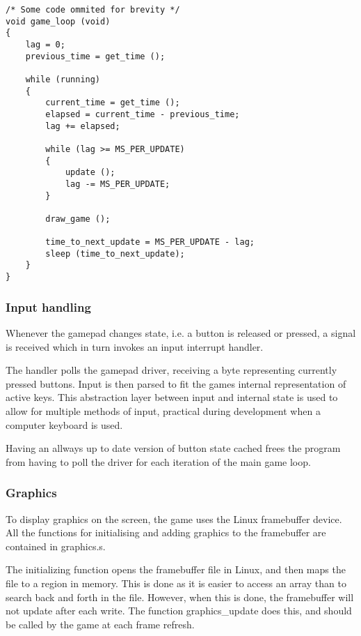 \begin{lstlisting}[caption={Main game loop}, label={lst:main-game-loop}]
/* Some code ommited for brevity */
void game_loop (void)
{
    lag = 0;
    previous_time = get_time ();

    while (running)
    {
        current_time = get_time ();
        elapsed = current_time - previous_time;
        lag += elapsed;

        while (lag >= MS_PER_UPDATE)
        {
            update ();
            lag -= MS_PER_UPDATE;
        }

        draw_game ();

        time_to_next_update = MS_PER_UPDATE - lag;
        sleep (time_to_next_update);
    }
}
\end{lstlisting}


\subsubsection{Input handling}

Whenever the gamepad changes state, i.e. a button is released or pressed,
a signal is received which in turn invokes an input interrupt handler.

The handler polls the gamepad driver, receiving a byte representing currently
pressed buttons. Input is then parsed to fit the games internal representation
of active keys. This abstraction layer between input and internal state is used
to allow for multiple methods of input, practical during development when a
computer keyboard is used.

Having an allways up to date version of button state cached frees the program
from having to poll the driver for each iteration of the main game loop.

\subsubsection{Graphics}
To display graphics on the screen, the game uses the Linux framebuffer device.
All the functions for initialising and adding graphics to the framebuffer are contained in graphics.s.

The initializing function opens the framebuffer file in Linux, and then maps the file to a region in memory.
This is done as it is easier to access an array than to search back and forth in the file.
However, when this is done, the framebuffer will not update after each write.
The function graphics_update does this, and should be called by the game at each frame refresh.

